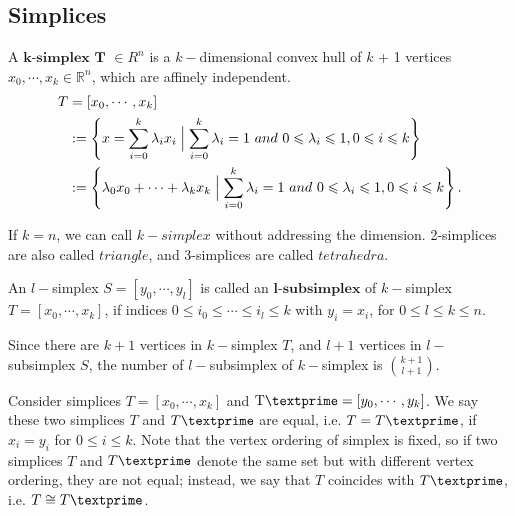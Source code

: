     \subsection{Simplices}
    \noindent
    \begin{definition*}
    A $\textbf{k-simplex T}$ $\in{R}^n$ is a ${k-}$dimensional convex hull of ${k}$ + 1 vertices ${x}_0, \cdots, {x}_k \in \mathbb{R}^n$, which are affinely independent.\\
    \begin{equation*}
    \begin{split}
    {T} & = [{x}_0, \cdots, {x}_k ]\\
    & := \left\{{x} = \sum\limits_{i=0}^k \lambda_i {x}_i \Bigm| \sum\limits_{i=0}^k \lambda_i = 1 ~and~ 0 \leqslant \lambda_i \leqslant 1, 0 \leqslant i \leqslant k \right\}\\
    & := \left\{\lambda_0{x}_0 + \cdots + \lambda_k{x}_k \Bigm| \sum\limits_{i=0}^k \lambda_i = 1 ~and~ 0 \leqslant \lambda_i \leqslant 1, 0 \leqslant i \leqslant k \right\}.
    \end{split}
    \end{equation*}
    \end{definition*}
    If ${k} = n$, we can call ${k-simplex}$ without addressing the dimension. 2-simplices are also called ${triangle}$, and 3-simplices are called ${tetrahedra}$.

    \begin{definition*}
    An  ${l-}$simplex ${S} = [{y}_0, \cdots, {y}_l]$ is called an $\textbf{l-subsimplex}$ of ${k-}$simplex ${T} = [{x}_0, \cdots, {x}_k]$, if indices $0 \leqslant {i}_0 \leqslant \cdots\leqslant{i}_l \leqslant k$ with ${y}_i = {x}_i$, for $0 \leqslant l \leqslant k \leqslant n$.
    \end{definition*}
    Since there are $k+1$ vertices in ${k-}$simplex ${T}$, and $l+1$ vertices in ${l-}$subsimplex ${S}$, the number of ${l-}$subsimplex of ${k-}$simplex is $\binom{k+1}{l+1}$.


    Consider simplices ${T} = [{x}_0, \cdots, {x}_k]$ and $\text{T\textprime} = [{y}_0, \cdots, {y}_k]$. We say these two simplices ${T}$ and ${T\textprime}$ are equal, i.e. ${T} = {T\textprime}$, if ${x}_i = {y}_i$ for $0 \leqslant i \leqslant k$. Note that the vertex ordering of simplex is fixed, so if two simplices ${T}$ and ${T\textprime}$ denote the same set but with different vertex ordering, they are not equal; instead, we say that ${T}$ coincides with ${T\textprime}$, i.e. ${T} \cong {T\textprime}$.

